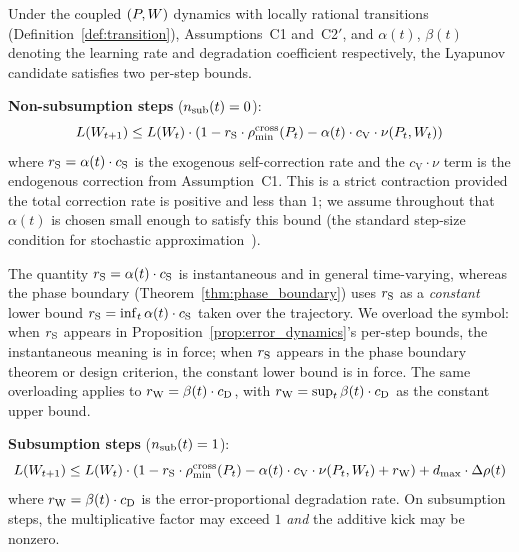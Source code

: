 \begin{proposition}
\label{prop:error_dynamics}
Under the coupled $(P, W)$ dynamics with locally rational transitions
(Definition~\ref{def:transition}), Assumptions~C1 and~C2$'$, and
$\alpha(t)$, $\beta(t)$ denoting the learning rate and degradation
coefficient respectively, the Lyapunov candidate satisfies two per-step
bounds.

\medskip
\noindent\textbf{Non-subsumption steps} ($n_{\mathrm{sub}}(t) = 0$):
\begin{equation}
\label{eq:contraction}
L(W_{t+1}) \leq L(W_t) \cdot
  \left(1 - r_{\mathrm{S}} \cdot \rho_{\min}^{\mathrm{cross}}(P_t)
  - \alpha(t) \cdot c_{\mathrm{V}} \cdot \nu(P_t, W_t)\right)
\end{equation}
where $r_{\mathrm{S}} = \alpha(t) \cdot c_{\mathrm{S}}$ is the exogenous
self-correction rate and the $c_{\mathrm{V}} \cdot \nu$ term is the
endogenous correction from Assumption~C1.  This is a strict contraction
provided the total correction rate is positive and less than $1$; we
assume throughout that $\alpha(t)$ is chosen small enough to satisfy
this bound (the standard step-size condition for stochastic
approximation~\citep{robbins1951stochastic}).

\begin{remark}
\label{rem:rs_notation}
The quantity $r_{\mathrm{S}} = \alpha(t) \cdot c_{\mathrm{S}}$ is instantaneous
and in general time-varying, whereas the phase boundary
(Theorem~\ref{thm:phase_boundary}) uses $r_{\mathrm{S}}$ as a \emph{constant}
lower bound $r_{\mathrm{S}} = \inf_t \alpha(t) \cdot c_{\mathrm{S}}$ taken over
the trajectory.  We overload the symbol: when $r_{\mathrm{S}}$ appears in
Proposition~\ref{prop:error_dynamics}'s per-step bounds, the
instantaneous meaning is in force; when $r_{\mathrm{S}}$ appears in the phase
boundary theorem or design criterion, the constant lower bound is in
force.  The same overloading applies to
$r_{\mathrm{W}} = \beta(t) \cdot c_{\mathrm{D}}$, with $r_{\mathrm{W}} = \sup_t \beta(t)
\cdot c_{\mathrm{D}}$ as the constant upper bound.
\end{remark}

\medskip
\noindent\textbf{Subsumption steps} ($n_{\mathrm{sub}}(t) = 1$):
\begin{equation}
\label{eq:expansion}
L(W_{t+1}) \leq L(W_t) \cdot
  \left(1 - r_{\mathrm{S}} \cdot \rho_{\min}^{\mathrm{cross}}(P_t)
  - \alpha(t) \cdot c_{\mathrm{V}} \cdot \nu(P_t, W_t) + r_{\mathrm{W}}\right)
  + d_{\mathrm{max}} \cdot \Delta\rho(t)
\end{equation}
where $r_{\mathrm{W}} = \beta(t) \cdot c_{\mathrm{D}}$ is the error-proportional
degradation rate.  On subsumption steps, the multiplicative factor may
exceed $1$ \emph{and} the additive kick may be nonzero.
\end{proposition}

